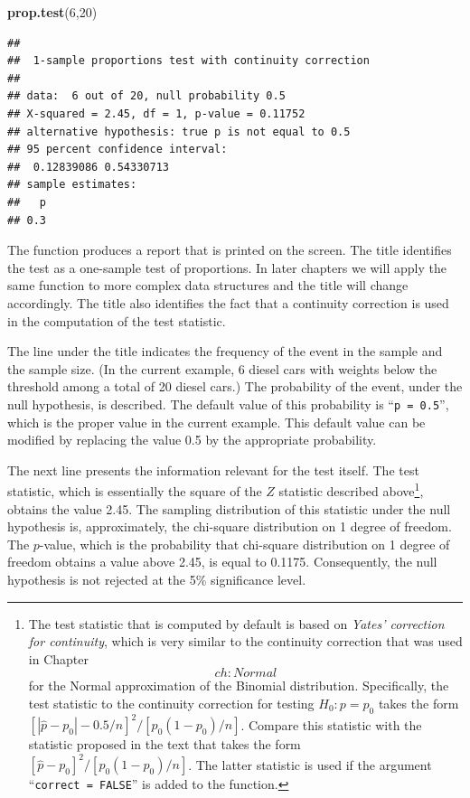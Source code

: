 \documentclass[]{krantz}
\makeatletter
\newenvironment{Shaded}{\begin{snugshade}}{\end{snugshade}}
\newcommand{\KeywordTok}[1]{\textcolor[rgb]{0.13,0.29,0.53}{\textbf{#1}}}
\newcommand{\DecValTok}[1]{\textcolor[rgb]{0.00,0.00,0.81}{#1}}
\newcommand{\NormalTok}[1]{#1}
\newenvironment{kframe}{%
\medskip{}
\setlength{\fboxsep}{.8em}
 \def\at@end@of@kframe{}%
 \ifinner\ifhmode%
  \def\at@end@of@kframe{\end{minipage}}%
  \begin{minipage}{\columnwidth}%
 \fi\fi%
 \def\FrameCommand##1{\hskip\@totalleftmargin \hskip-\fboxsep
 \colorbox{shadecolor}{##1}\hskip-\fboxsep
     \hskip-\linewidth \hskip-\@totalleftmargin \hskip\columnwidth}%
 \MakeFramed {\advance\hsize-\width
   \@totalleftmargin\z@ \linewidth\hsize
   \@setminipage}}%
 {\par\unskip\endMakeFramed%
 \at@end@of@kframe}
\renewenvironment{Shaded}{\begin{kframe}}{\end{kframe}}
\theoremstyle{definition}
\theoremstyle{definition}
\theoremstyle{definition}
\theoremstyle{remark}
\makeatother
\begin{document}
\begin{Shaded}
\begin{Highlighting}[]
\KeywordTok{prop.test}\NormalTok{(}\DecValTok{6}\NormalTok{,}\DecValTok{20}\NormalTok{)}
\end{Highlighting}
\end{Shaded}

\begin{verbatim}
## 
##  1-sample proportions test with continuity correction
## 
## data:  6 out of 20, null probability 0.5
## X-squared = 2.45, df = 1, p-value = 0.11752
## alternative hypothesis: true p is not equal to 0.5
## 95 percent confidence interval:
##  0.12839086 0.54330713
## sample estimates:
##   p 
## 0.3
\end{verbatim}

The function produces a report that is printed on the screen. The title
identifies the test as a one-sample test of proportions. In later
chapters we will apply the same function to more complex data structures
and the title will change accordingly. The title also identifies the
fact that a continuity correction is used in the computation of the test
statistic.

The line under the title indicates the frequency of the event in the
sample and the sample size. (In the current example, 6 diesel cars with
weights below the threshold among a total of 20 diesel cars.) The
probability of the event, under the null hypothesis, is described. The
default value of this probability is ``\texttt{p\ =\ 0.5}'', which is
the proper value in the current example. This default value can be
modified by replacing the value 0.5 by the appropriate probability.

The next line presents the information relevant for the test itself. The
test statistic, which is essentially the square of the \(Z\) statistic
described above\footnote{The test statistic that is computed by default
  is based on \emph{Yates' correction for continuity}, which is very
  similar to the continuity correction that was used in
  Chapter~\[ch:Normal\] for the Normal approximation of the Binomial
  distribution. Specifically, the test statistic to the continuity
  correction for testing \(H_0:p = p_0\) takes the form
  \([|\hat p - p_0|-0.5/n]^2/[p_0(1-p_0)/n]\). Compare this statistic
  with the statistic proposed in the text that takes the form
  \([\hat p - p_0]^2/[p_0(1-p_0)/n]\). The latter statistic is used if
  the argument ``\texttt{correct\ =\ FALSE}'' is added to the function.},
obtains the value 2.45. The sampling distribution of this statistic
under the null hypothesis is, approximately, the chi-square distribution
on 1 degree of freedom. The \(p\)-value, which is the probability that
chi-square distribution on 1 degree of freedom obtains a value above
2.45, is equal to 0.1175. Consequently, the null hypothesis is not
rejected at the 5\% significance level.
\end{document}
